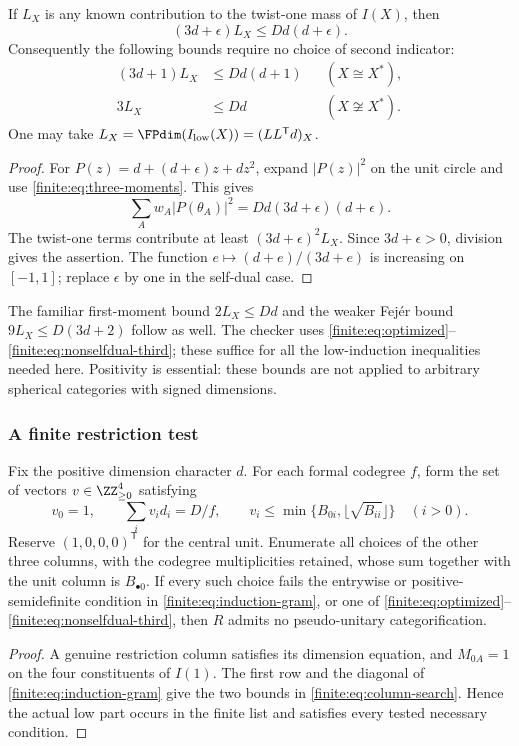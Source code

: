 \begin{proposition}\label{finite:prop:optimized-moment}
If $L_X$ is any known contribution to the twist-one mass of $I(X)$, then
\[
 (3d+\epsilon)L_X\leq Dd(d+\epsilon).
\]
Consequently the following bounds require no choice of second indicator:
\begin{align}
 (3d+1)L_X&\leq Dd(d+1)&& (X\cong X^*),\label{finite:eq:optimized}\\
 3L_X&\leq Dd&& (X\not\cong X^*).\label{finite:eq:nonselfdual-third}
\end{align}
One may take $L_X=\FPdim(I_{\rm low}(X))=(LL^{\mathsf T}d)_X$.
\end{proposition}
\begin{proof}
For $P(z)=d+(d+\epsilon)z+dz^2$, expand $|P(z)|^2$ on the unit circle
and use \eqref{finite:eq:three-moments}. This gives
\[
 \sum_Aw_A|P(\theta_A)|^2=Dd(3d+\epsilon)(d+\epsilon).
\]
The twist-one terms contribute at least $(3d+\epsilon)^2L_X$.
Since $3d+\epsilon>0$, division gives the assertion.
The function $e\mapsto(d+e)/(3d+e)$ is increasing on $[-1,1]$;
replace $\epsilon$ by one in the self-dual case.
\end{proof}

The familiar first-moment bound $2L_X\leq Dd$ and the weaker Fej\'er
bound $9L_X\leq D(3d+2)$ follow as well. The checker uses
\eqref{finite:eq:optimized}--\eqref{finite:eq:nonselfdual-third}; these suffice for
all the low-induction inequalities needed here. Positivity is essential:
these bounds are not applied to arbitrary spherical categories with signed
dimensions.

\subsubsection{A finite restriction test}
\begin{proposition}\label{finite:prop:low-certificate}
Fix the positive dimension character $d$. For each formal codegree $f$,
form the set of vectors $v\in\ZZ_{\geq0}^4$ satisfying
\begin{equation}\label{finite:eq:column-search}
 v_0=1,\qquad \sum_i v_id_i=D/f,\qquad
 v_i\leq\min\{B_{0i},\lfloor\sqrt{B_{ii}}\rfloor\}\quad(i>0).
\end{equation}
Reserve $(1,0,0,0)^{\mathsf T}$ for the central unit. Enumerate all choices
of the other three columns, with the codegree multiplicities retained,
whose sum together with the unit column is $B_{\bullet0}$.
If every such choice fails the entrywise or positive-semidefinite condition
in \eqref{finite:eq:induction-gram}, or one of
\eqref{finite:eq:optimized}--\eqref{finite:eq:nonselfdual-third}, then $R$ admits no
pseudo-unitary categorification.
\end{proposition}
\begin{proof}
A genuine restriction column satisfies its dimension equation, and
$M_{0A}=1$ on the four constituents of $I(1)$. The first row and the diagonal
of \eqref{finite:eq:induction-gram} give the two bounds in
\eqref{finite:eq:column-search}. Hence the actual low part occurs in the finite
list and satisfies every tested necessary condition.
\end{proof}

